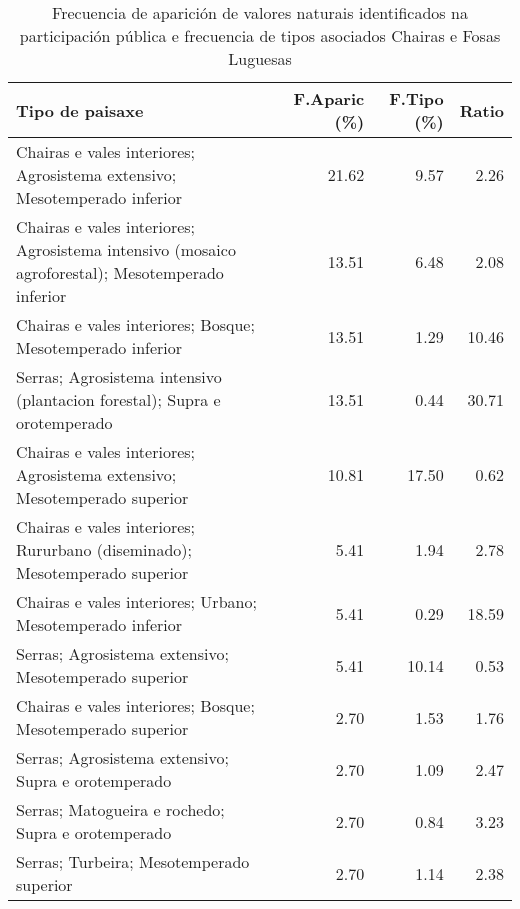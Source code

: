 \begin{table}[p]
\centering
\caption{Frecuencia de aparición de valores naturais identificados na participación pública e frecuencia de tipos asociados Chairas e Fosas Luguesas} 
\label{vsixotnat6}
\begin{tabular}{lrrr}
  \hline
Tipo de paisaxe & F.Aparic (\%) & F.Tipo (\%) & Ratio \\ 
  \hline
Chairas e vales interiores; Agrosistema extensivo; Mesotemperado inferior & 21.62 & 9.57 & 2.26 \\ 
  Chairas e vales interiores; Agrosistema intensivo (mosaico agroforestal); Mesotemperado inferior & 13.51 & 6.48 & 2.08 \\ 
  Chairas e vales interiores; Bosque; Mesotemperado inferior & 13.51 & 1.29 & 10.46 \\ 
  Serras; Agrosistema intensivo (plantacion forestal); Supra e orotemperado & 13.51 & 0.44 & 30.71 \\ 
  Chairas e vales interiores; Agrosistema extensivo; Mesotemperado superior & 10.81 & 17.50 & 0.62 \\ 
  Chairas e vales interiores; Rururbano (diseminado); Mesotemperado superior & 5.41 & 1.94 & 2.78 \\ 
  Chairas e vales interiores; Urbano; Mesotemperado inferior & 5.41 & 0.29 & 18.59 \\ 
  Serras; Agrosistema extensivo; Mesotemperado superior & 5.41 & 10.14 & 0.53 \\ 
  Chairas e vales interiores; Bosque; Mesotemperado superior & 2.70 & 1.53 & 1.76 \\ 
  Serras; Agrosistema extensivo; Supra e orotemperado & 2.70 & 1.09 & 2.47 \\ 
  Serras; Matogueira e rochedo; Supra e orotemperado & 2.70 & 0.84 & 3.23 \\ 
  Serras; Turbeira; Mesotemperado superior & 2.70 & 1.14 & 2.38 \\ 
   \hline
\end{tabular}
\end{table}
